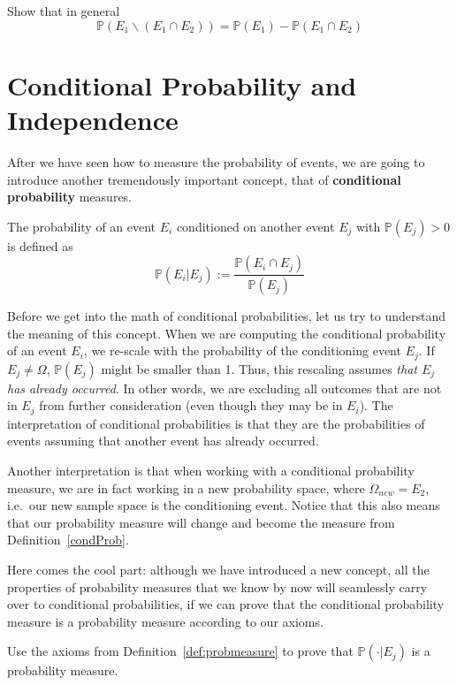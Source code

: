 \begin{Exercise}
Show that in general $$ \mathbb{P}(E_{1}\backslash (E_{1}\cap E_{2})) 
= \mathbb{P}(E_{1}) - \mathbb{P}(E_{1}\cap E_{2}) $$
\end{Exercise}

\section{Conditional Probability and Independence}
After we have seen how to measure the probability of events, we are going to introduce another
tremendously important concept, that of \textbf{conditional probability} measures.

\begin{Definition}
The probability of an event $ E_{i} $ conditioned on another event $ E_{j} $ with $ \mathbb{P}(E_{j}) > 0 $ 
is defined as $$ \mathbb{P}(E_{i}|E_{j}) := \dfrac{\mathbb{P}(E_{i} \cap E_{j})}{\mathbb{P}(E_{j})} $$
\label{condProb}
\end{Definition}

Before we get into the math of conditional probabilities, let us try to understand the meaning of this concept. 
When we are computing the conditional probability of an event $ E_{i} $, we re-scale with the 
probability of the conditioning event $ E_{j} $. If $ E_{j} \not = \Omega $, $ \mathbb{P}(E_{j}) $
might be smaller than 1. Thus, this rescaling assumes \textit{that $ E_{j} $ has already occurred}. In other
words, we are excluding all outcomes that are not in $ E_{j} $ from further consideration (even though they
may be in $ E_{i} $). The interpretation of conditional probabilities is that they are the probabilities
of events assuming that another event has already occurred.

Another interpretation is that when working with a conditional probability measure, we are in fact working
in a new probability space, where $ \Omega_{new} = E_{2} $, i.e.\ our new sample space is the conditioning event.
Notice that this also means that our probability measure will change and become the
measure from Definition~\ref{condProb}.

Here comes the cool part: although we have introduced a new concept, all the properties of probability
measures that we know by now will seamlessly carry over to conditional probabilities, if we can prove
that the conditional probability measure is a probability measure according to our axioms.

\begin{Exercise}
Use the axioms from Definition~\ref{def:probmeasure} to prove that $ \mathbb{P}(\cdot|E_{j}) $ is a probability measure.
\end{Exercise} 

